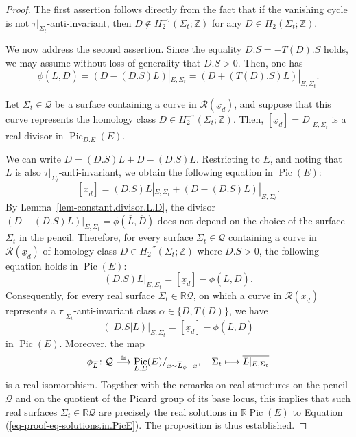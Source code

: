 \documentclass[10pt,a4paper]{article}
\numberwithin{equation}{section}
\theoremstyle{definition}
\theoremstyle{plain}
\theoremstyle{remark}
\newcommand{\R}{\mathbb{R}}
\newcommand{\Z}{\mathbb{Z}}
\DeclareMathOperator{\Pic}{Pic}
\newcommand{\lra}{\longrightarrow}
\def\lowcong{\vbox to 0pt{\vss\hbox{$\scriptstyle\cong$}\vskip-1.5pt}}
\begin{document}
\begin{proof}
  The first assertion follows directly from the fact that if the vanishing cycle is not $\tau|_{\Sigma_t}$-anti-invariant, then $D\notin  H_2^{-\tau}(\Sigma_t;\Z)$ for any $D\in H_2(\Sigma_t;\Z)$.
  
  We now address the second assertion. Since the equality $D.S=-T(D).S$ holds, we may assume without loss of generality that $D.S> 0$.
   Then, one has
  $$\phi\left(\overline{L},\overline{D}\right)=\left(D-(D.S)L\right)|_{E,\Sigma_t}=\left(D+(T(D).S)L\right)|_{E,\Sigma_t}.$$ 
 
  Let $\Sigma_t \in \mathcal{Q}$  be a surface containing a curve in  $\mathcal{R}(\underline{x}_d)$, and suppose that this curve represents the homology class $D\in H_2^{-\tau}(\Sigma_t;\Z)$. Then, $[\underline{x}_d]=D|_{E,\Sigma_t}$ is a real divisor in $\Pic_{D.E}(E)$.
    

We can write  $D=(D.S)L+D-(D.S)L$. Restricting to $E$, and noting that $L$ is also $\tau|_{\Sigma_t}$-anti-invariant, we obtain the following equation in $\Pic(E)$:
  $$\left[\underline{x}_d\right]=(D.S)L|_{E,\Sigma_t}+\left(D-(D.S)L\right)|_{E,\Sigma_t}.$$
 By Lemma~\ref{lem-constant.divisor.L.D}, the divisor $\left(D-(D.S)L\right)|_{E,\Sigma_t}=\phi(\overline{L},\overline{D})$ does not depend on the choice of the surface $\Sigma_t$ in the pencil. 
 Therefore, for every surface $\Sigma_t \in \mathcal{Q}$ containing a curve in $\mathcal{R}(\underline{x}_d)$ of homology class $D\in H_2^{-\tau}(\Sigma_t;\Z)$ where $D.S> 0$, the following equation holds in $\Pic(E)$:
 $$(D.S)L|_{E,\Sigma_t}=[\underline{x}_d]-\phi\left(\overline{L},\overline{D}\right).$$
 Consequently, for every real surface $\Sigma_t \in  \R \mathcal{Q}$, on which a curve in $\mathcal{R}(\underline{x}_d)$ represents a $\tau|_{\Sigma_t}$-anti-invariant class $\alpha\in \{D,T (D)\}$, we have
 \begin{equation} \label{eq-proof-eq-solutions.in.PicE}
     (|D.S|L)|_{E,\Sigma_t}=[\underline{x}_d]-\phi(\overline{L},\overline{D})
 \end{equation}
  in $ \Pic(E)$. Moreover, the map
  $$   \phi_{\overline{L}}\colon  \mathcal{Q} \overset{\lowcong}\lra \Pic_{L.E} (E)/_{x\sim \overline{L}_{\phi}-x}, \quad    \Sigma_t \longmapsto \overline{L|_{E,\Sigma_t}}$$
   is a real isomorphism. Together with the remarks on real structures on the pencil $\mathcal{Q}$ and on the quotient of the Picard group of its base locus, this implies that such real surfaces $\Sigma_t \in  \R \mathcal{Q}$ are precisely the real solutions in  $\R \Pic(E)$ to Equation (\ref{eq-proof-eq-solutions.in.PicE}). The proposition is thus established.
  \end{proof}
\end{document}
